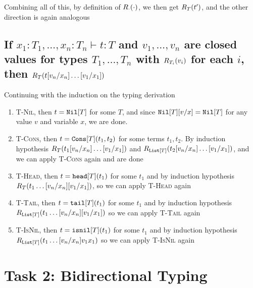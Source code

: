 \documentclass{article}
\newcommand{\rpred}[2]{\ensuremath R_{#1}(#2)}
\newcommand{\tylist}[1]{\ensuremath \mathtt{List}[#1]}
\newcommand{\cons}[3]{\ensuremath \mathtt{Cons}[#1](#2,#3)}
\newcommand{\nil}[1]{\ensuremath \mathtt{Nil}[#1]}
\newcommand{\isnil}[2]{\ensuremath \mathtt{isnil}[#1](#2)}
\newcommand{\head}[2]{\ensuremath \mathtt{head}[#1](#2)}
\newcommand{\tail}[2]{\ensuremath \mathtt{tail}[#1](#2)}
\newcommand{\subst}[3]{\ensuremath #1[#2/#3]}
\begin{document}
Combining all of this, by definition of $\rpred{\cdot}{\cdot}$, we then get $\rpred{T}{t^{\prime}}$, and the other direction is again analogous


\subsection*{If $x_1:T_1,\dots,x_n:T_n\vdash t:T$ and $v_1,\dots,v_n$ are closed values for types $T_1,\dots,T_n$ with $\rpred{T_i}{v_i}$ for each $i$, then $\rpred{T}{\subst{\subst{t}{v_n}{x_n}\dots}{v_1}{x_1}}$}

Continuing with the induction on the typing derivation
\begin{enumerate}
\item \textsc{T-Nil}, then $t=\nil{T}$ for some $T$, and since $\subst{\nil{T}}{v}{x} = \nil{T}$ for any value $v$ and variable $x$, we are done.
\item \textsc{T-Cons}, then $t=\cons{T}{t_1}{t_2}$ for some terms $t_1,t_2$. 
By induction hypothesis $\rpred{T}{\subst{\subst{t_1}{v_n}{x_n}\dots}{v_1}{x_1}}$ and $\rpred{\tylist{T}}{\subst{\subst{t_2}{v_n}{x_n}\dots}{v_1}{x_1}}$, and we can apply \textsc{T-Cons} again and are done
\item \textsc{T-Head}, then $t=\head{T}{t_1}$ for some $t_1$ and by induction hypothesis $\rpred{T}{\subst{\subst{t_1\dots}{v_n}{x_n}}{v_1}{x_1}}$, so we can apply \textsc{T-Head} again
\item \textsc{T-Tail}, then $t=\tail{T}{t_1}$ for some $t_1$ and by induction hypothesis $\rpred{\tylist{T}}{\subst{\subst{t_1\dots}{v_n}{x_n}}{v_1}{x_1}}$ so we can apply \textsc{T-Tail} again
\item \textsc{T-IsNil}, then $t=\isnil{T}{t_1}$ for some $t_1$ and by induction hypothesis $\rpred{\tylist{T}}{\subst{t_1\dots}{v_n}{x_n}{v_1}{x_1}}$ so we can apply \textsc{T-IsNil} again
\end{enumerate}

\section*{Task 2: Bidirectional Typing}
\end{document}

